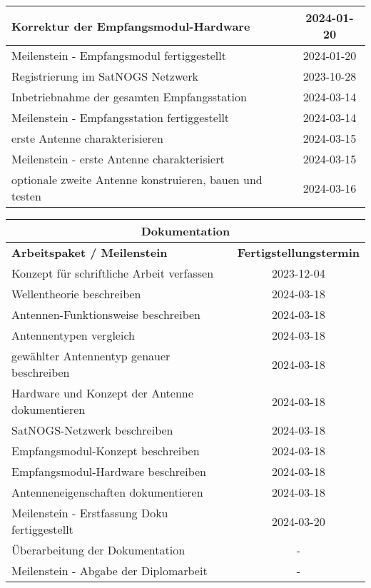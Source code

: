 \begin{table}[!ht]
\begin{tabular}{|l|c|}
		Korrektur der Empfangsmodul-Hardware & 2024-01-20 \\ \hline
		Meilenstein - Empfangsmodul fertiggestellt & 2024-01-20 \\ \hline
		Registrierung im SatNOGS Netzwerk & 2023-10-28 \\ \hline
		Inbetriebnahme der gesamten Empfangsstation & 2024-03-14 \\ \hline
		Meilenstein - Empfangsstation fertiggestellt & 2024-03-14 \\ \hline
		erste Antenne charakterisieren & 2024-03-15 \\ \hline
		Meilenstein - erste Antenne charakterisiert & 2024-03-15 \\ \hline
		optionale zweite Antenne konstruieren, bauen und testen & 2024-03-16 \\ \hline
	\end{tabular}
\end{table}

\begin{table}[!ht]
	\begin{tabular}{|l|c|}
		\multicolumn{2}{c}{\textbf{Dokumentation}} \\ \hline
		\textbf{Arbeitspaket / Meilenstein} & \textbf{Fertigstellungstermin} \\ \hline
		Konzept für schriftliche Arbeit verfassen & 2023-12-04 \\ \hline
		Wellentheorie beschreiben & 2024-03-18 \\ \hline
		Antennen-Funktionsweise beschreiben & 2024-03-18 \\ \hline
		Antennentypen vergleich & 2024-03-18 \\ \hline
		gewählter Antennentyp genauer beschreiben & 2024-03-18 \\ \hline
		Hardware und Konzept der Antenne dokumentieren & 2024-03-18 \\ \hline
		SatNOGS-Netzwerk beschreiben & 2024-03-18 \\ \hline
		Empfangsmodul-Konzept beschreiben & 2024-03-18 \\ \hline
		Empfangsmodul-Hardware beschreiben & 2024-03-18 \\ \hline
		Antenneneigenschaften dokumentieren & 2024-03-18 \\ \hline
		Meilenstein - Erstfassung Doku fertiggestellt & 2024-03-20 \\ \hline
		Überarbeitung der Dokumentation & - \\ \hline
		Meilenstein - Abgabe der Diplomarbeit & - \\ \hline
	\end{tabular}
\end{table}